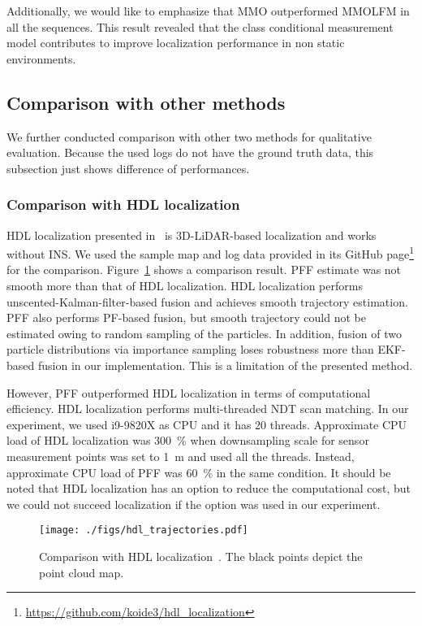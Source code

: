 \documentclass[letterpaper, 10 pt, conference]{ieeeconf}  %
\begin{document}
Additionally, we would like to emphasize that MMO outperformed MMOLFM in all the sequences.
This result revealed that the class conditional measurement model contributes to improve localization performance in non static environments.



\subsection{Comparison with other methods}

We further conducted comparison with other two methods for qualitative evaluation.
Because the used logs do not have the ground truth data, this subsection just shows difference of performances.

\subsubsection{Comparison with HDL localization}

HDL localization presented in~\cite{hdl_localization} is 3D-LiDAR-based localization and works without INS.
We used the sample map and log data provided in its GitHub page\footnote{\url{https://github.com/koide3/hdl_localization}} for the comparison.
Figure~\ref{fig:hdl_trajectories} shows a comparison result.
PFF estimate was not smooth more than that of HDL localization.
HDL localization performs unscented-Kalman-filter-based fusion and achieves smooth trajectory estimation.
PFF also performs PF-based fusion, but smooth trajectory could not be estimated owing to random sampling of the particles.
In addition, fusion of two particle distributions via importance sampling loses robustness more than EKF-based fusion in our implementation.
This is a limitation of the presented method.

However, PFF outperformed HDL localization in terms of computational efficiency.
HDL localization performs multi-threaded NDT scan matching.
In our experiment, we used i9-9820X as CPU and it has 20 threads.
Approximate CPU load of HDL localization was 300~\% when downsampling scale for sensor measurement points was set to 1~m and used all the threads.
Instead, approximate CPU load of PFF was 60~\% in the same condition.
It should be noted that HDL localization has an option to reduce the computational cost, but we could not succeed localization if the option was used in our experiment.

\begin{figure}[!t]
    \begin{center}
        \texttt{[image: ./figs/hdl\_trajectories.pdf]}
        \caption{Comparison with HDL localization~\cite{hdl_localization}. The black points depict the point cloud map.}
        \label{fig:hdl_trajectories}
    \end{center}
\end{figure}
\end{document}
